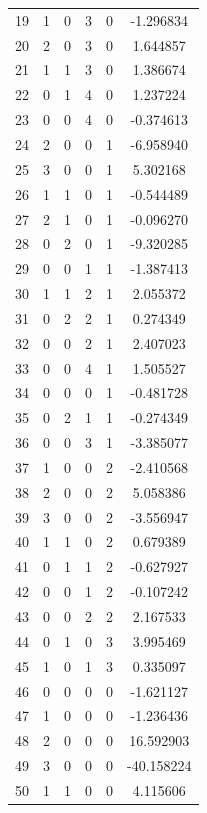 \documentclass[preprint,12pt]{elsarticle}
\begin{document}
\begin{table}
\begin{minipage}[!h]{0.25\textwidth}
{\begin{tabular}{|c|cccc|c|}
19 &   1 &   0 &   3 &   0 &  -1.296834 \\
20 &   2 &   0 &   3 &   0 &   1.644857 \\
21 &   1 &   1 &   3 &   0 &   1.386674 \\
22 &   0 &   1 &   4 &   0 &   1.237224 \\
23 &   0 &   0 &   4 &   0 &  -0.374613 \\
24 &   2 &   0 &   0 &   1 &  -6.958940 \\
25 &   3 &   0 &   0 &   1 &   5.302168 \\
26 &   1 &   1 &   0 &   1 &  -0.544489 \\
27 &   2 &   1 &   0 &   1 &  -0.096270 \\
28 &   0 &   2 &   0 &   1 &  -9.320285 \\
29 &   0 &   0 &   1 &   1 &  -1.387413 \\
30 &   1 &   1 &   2 &   1 &   2.055372 \\
31 &   0 &   2 &   2 &   1 &   0.274349 \\
32 &   0 &   0 &   2 &   1 &   2.407023 \\
33 &   0 &   0 &   4 &   1 &   1.505527 \\
34 &   0 &   0 &   0 &   1 &  -0.481728 \\
35 &   0 &   2 &   1 &   1 &  -0.274349 \\
36 &   0 &   0 &   3 &   1 &  -3.385077 \\
37 &   1 &   0 &   0 &   2 &  -2.410568 \\
38 &   2 &   0 &   0 &   2 &   5.058386 \\
39 &   3 &   0 &   0 &   2 &  -3.556947 \\
40 &   1 &   1 &   0 &   2 &   0.679389 \\
41 &   0 &   1 &   1 &   2 &  -0.627927 \\
42 &   0 &   0 &   1 &   2 &  -0.107242 \\
43 &   0 &   0 &   2 &   2 &   2.167533 \\
44 &   0 &   1 &   0 &   3 &   3.995469 \\
45 &   1 &   0 &   1 &   3 &   0.335097 \\
46 &   0 &   0 &   0 &   0 &  -1.621127 \\
47 &   1 &   0 &   0 &   0 &  -1.236436 \\
48 &   2 &   0 &   0 &   0 &  16.592903 \\
49 &   3 &   0 &   0 &   0 & -40.158224 \\
50 &   1 &   1 &   0 &   0 &   4.115606 \\

\end{tabular}}
\end{minipage}
\end{table}
\end{document}
